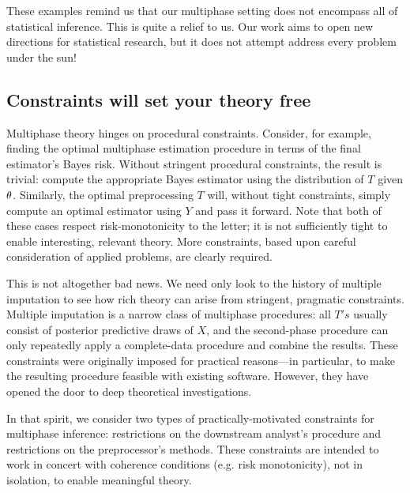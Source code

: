These examples remind us that our multiphase setting does not encompass all of statistical inference.
This is quite a relief to us.
Our work aims to open new directions for statistical research, but it does not attempt address every problem under the sun!

\subsection{Constraints will set your theory free}
\label{multiphase:sec:constraints}

Multiphase theory hinges on procedural constraints.
Consider, for example, finding the optimal multiphase estimation procedure in terms of the final estimator's Bayes risk.
Without stringent procedural constraints, the result is trivial: compute the appropriate Bayes estimator using the distribution of $T$ given $\theta$.
Similarly, the optimal preprocessing $T$ will, without tight constraints, simply compute an optimal estimator using $Y$ and pass it forward.
Note that both of these cases respect risk-monotonicity to the letter; it is not sufficiently tight to enable interesting, relevant theory.
More constraints, based upon careful consideration of applied problems, are clearly required.

This is not altogether bad news.
We need only look to the history of multiple imputation to see how rich theory can arise from stringent, pragmatic constraints.
Multiple imputation is a narrow class of multiphase procedures: all $T's$ usually consist of posterior predictive draws of $X$, and the second-phase procedure can only repeatedly apply a complete-data procedure and combine the results.
These constraints were originally imposed for practical reasons---in particular, to make the resulting procedure feasible with existing software.
However, they have opened the door to deep theoretical investigations.

In that spirit, we consider two types of practically-motivated constraints for multiphase inference: restrictions on the downstream analyst's procedure and restrictions on the preprocessor's methods.
These constraints are intended to work in concert with coherence conditions (e.g. risk monotonicity), not in isolation, to enable meaningful theory.

